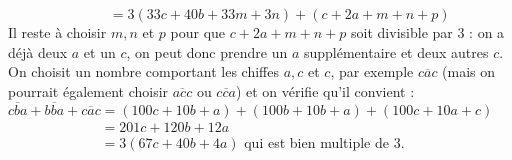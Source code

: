 \begin{enumerate}
\begin{enumerate}
         $\phantom{\overline{cba}+\overline{bba}+\overline{mnp}} =3(33c+40b+33m+3n)+(c+2a+m+n+p)$ \\
         Il reste à choisir $m, n$ et $p$ pour que $c+2a+m+n+p$ soit divisible par 3 : on a déjà deux $a$ et un $c$, on peut donc prendre un $a$ supplémentaire et deux autres $c$. On choisit un nombre comportant les chiffes $a, c$ et $c$, par exemple $\overline{cac}$ (mais on pourrait également choisir $\overline{acc}$ ou $\overline{cca}$) et on vérifie qu'il convient : \\
         $\overline{cba}+\overline{bba}+\overline{cac} =(100c+10b+a)+(100b+10b+a)+(100c+10a+c)$ \\
         $\phantom{\overline{cba}+\overline{bba}+\overline{cac}} =201c+120b+12a$ \\
         $\phantom{\overline{cba}+\overline{bba}+\overline{cac}} =3(67c+40b+4a)$ qui est bien multiple de 3. \\
      \end{enumerate}
   \end{enumerate}
